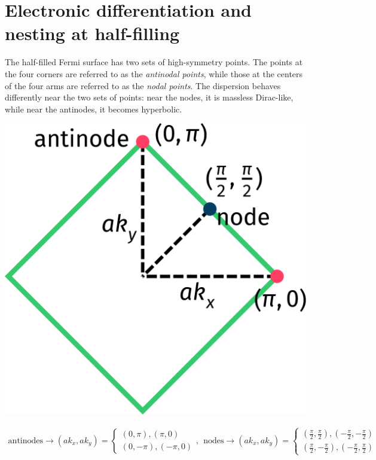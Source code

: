 \documentclass[12pt,onecolumn]{revtex4-2}
\begin{document}
\section{Electronic differentiation and nesting at half-filling}
\begin{minipage}{0.65\textwidth}
	The half-filled Fermi surface has two sets of high-symmetry points. The points at the four corners are referred to as the \textit{antinodal points}, while those at the centers of the four arms are referred to as the \textit{nodal points}. The dispersion behaves differently near the two sets of points: near the nodes, it is massless Dirac-like, while near the antinodes, it becomes hyperbolic.
\end{minipage}
\hspace*{\fill}
\begin{minipage}{0.3\textwidth}
	\centering
	\includegraphics[width=\textwidth]{./Fsurf.pdf}
\end{minipage}

\begin{equation*}\begin{aligned}
	\text{antinodes} \to \left(ak_x, ak_y\right) = \begin{cases}
\left(0, \pi \right), \left(\pi, 0 \right)\\
\left(0, -\pi \right), \left(-\pi, 0\right)
	\end{cases}, ~ ~ \text{nodes} \to \left(ak_x, ak_y\right) = \begin{cases}
		\left(\frac{\pi}{2}, \frac{\pi}{2} \right), \left(-\frac{\pi}{2}, -\frac{\pi}{2}\right)\\
		\left(\frac{\pi}{2}, -\frac{\pi}{2} \right), \left(-\frac{\pi}{2}, \frac{\pi}{2}\right)
	\end{cases}
\end{aligned}\end{equation*}
\end{document}
